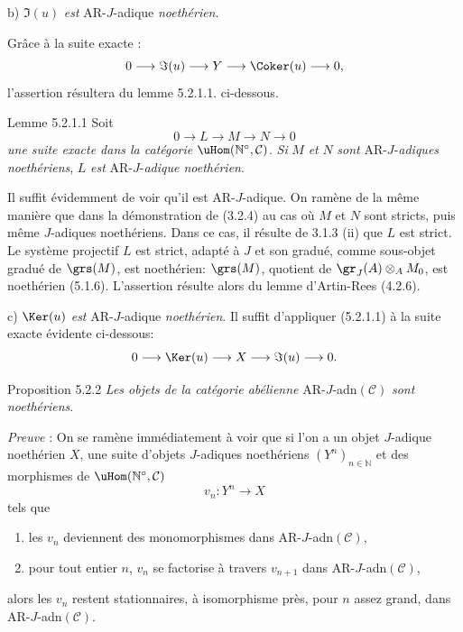 b) \(\Im(u)\) \emph{est} AR-\(J\)-adique \emph{noethérien}.

Grâce à la suite exacte :
\[
0\longrightarrow \Im(u)\longrightarrow Y\longrightarrow \Coker(u)\longrightarrow 0,
\]
l'assertion résultera du lemme 5.2.1.1. ci-dessous.

\begin{statement}{Lemme 5.2.1.1}
Soit
\[
0\longrightarrow L\longrightarrow M\longrightarrow N\longrightarrow0
\]
\emph{une suite exacte dans la catégorie} \(\uHom(\mathbb{N}^\circ,\mathcal{C})\). \emph{Si} \(M\) \emph{et} \(N\) \emph{sont} AR-\(J\)-\emph{adiques noethériens}, \(L\) \emph{est} AR-\(J\)-\emph{adique noethérien}.
\end{statement}

Il suffit évidemment de voir qu'il est AR-\(J\)-adique. On  ramène de la même manière que dans la démonstration de (3.2.4) au cas où \(M\) et \(N\) sont stricts, puis même \(J\)-adiques noethériens. Dans ce cas, il résulte de 3.1.3 (ii) que \(L\) est strict. Le système projectif \(L\) est strict, adapté à \(J\) et son gradué, comme sous-objet gradué de \(\grs(M)\), est noethérien: \(\grs(M)\), quotient de \(\gr_J(A)\otimes_A M_0\), est noethérien (5.1.6). L'assertion résulte alors du lemme d'Artin-Rees (4.2.6).

c) \(\Ker(u)\) \emph{est} AR-\(J\)-adique \emph{noethérien}. Il suffit d'appliquer (5.2.1.1) à la suite exacte évidente ci-dessous:
\[
0\longrightarrow \Ker(u)\longrightarrow X\longrightarrow \Im(u)\longrightarrow0.
\]

\begin{statement}{Proposition 5.2.2}
\emph{Les objets de la catégorie abélienne} AR-\(J\)-adn\((\mathcal{C})\) \emph{sont noethériens}.
\end{statement}

\emph{Preuve} : On se ramène immédiatement à voir que si l'on a un objet \(J\)-adique noethérien \(X\), une suite d'objets \(J\)-adiques noethériens \((Y^n)_{n\in\mathbb{N}}\) et des morphismes de \(\uHom(\mathbb{N}^\circ,\mathcal{C})\)
\[
v_n:Y^n\longrightarrow X
\]
tels que
\begin{enumerate}[label=\textup{(\roman*)}]
\item les \(v_n\) deviennent des monomorphismes dans AR-\(J\)-adn\((\mathcal{C})\),
\item pour tout entier \(n\), \(v_n\) se factorise à travers \(v_{n+1}\) dans AR-\(J\)-adn\((\mathcal{C})\),
\end{enumerate}
alors les \(v_n\) restent stationnaires, à isomorphisme près, pour \(n\) assez grand, dans AR-\(J\)-adn\((\mathcal{C})\).

